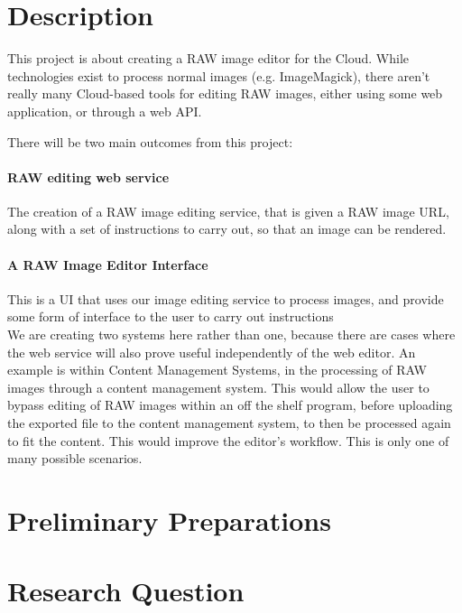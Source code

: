 \documentclass[14pt]{article}
\begin{document}
\maketitle

\section{Description}
This project is about creating a RAW image editor for the Cloud. While technologies
exist to process normal images (e.g. ImageMagick), there aren't really many Cloud-based
tools for editing RAW images, either using some web application, or through a web API.

There will be two main outcomes from this project:

\paragraph{RAW editing web service}
The creation of a RAW image editing service, that is given a RAW image URL,
along with a set of instructions to carry out, so that an image can be rendered.

\paragraph{A RAW Image Editor Interface}
This is a UI that uses our image editing service to process images, and provide
some form of interface to the user to carry out instructions
\\
We are creating two systems here rather than one, because there are cases where the
web service will also prove useful independently of the web editor. An example is within
Content Management Systems, in the processing of RAW images through a content management system.
This would allow the user to bypass editing of RAW images within an off the shelf program, before
uploading the exported file to the content management system, to then be processed again to fit the content.
This would improve the editor's workflow. This is only one of many possible scenarios.


\section{Preliminary Preparations}

\section{Research Question}
\end{document}
